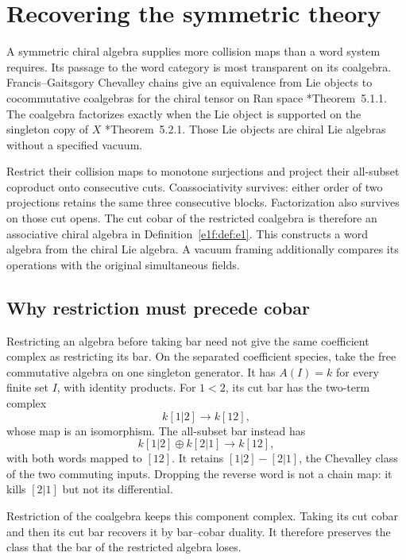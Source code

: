 \section{Recovering the symmetric theory}
\label{e1f:sec:symmetric}

A symmetric chiral algebra supplies more collision maps
than a word system requires. Its passage to the word
category is most transparent on its coalgebra.
Francis--Gaitsgory Chevalley chains give an equivalence
from Lie objects to cocommutative coalgebras for the chiral
tensor on Ran space \cite{chhop:FG}*{Theorem~5.1.1}.
The coalgebra factorizes exactly when the Lie object is
supported on the singleton copy of \(X\)
\cite{chhop:FG}*{Theorem~5.2.1}. Those Lie objects are
chiral Lie algebras without a specified vacuum.

Restrict their collision maps to monotone surjections and
project their all-subset coproduct onto consecutive cuts.
Coassociativity survives: either order of two projections
retains the same three consecutive blocks. Factorization
also survives on those cut opens. The cut cobar of the
restricted coalgebra is therefore an associative chiral
algebra in Definition~\ref{e1f:def:e1}. This constructs a
word algebra from the chiral Lie algebra. A vacuum framing
additionally compares its operations with the original
simultaneous fields.

\subsection{Why restriction must precede cobar}

Restricting\label{e1f:def:free-commutative-singleton-species} an algebra before taking bar need not give the
same coefficient complex as restricting its bar. On the
separated coefficient species, take the free commutative
algebra on one singleton generator. It has \(A(I)=k\)
for every finite set \(I\), with identity products.
For \(1<2\), its cut bar has the two-term complex
\[
 k[1|2]\longrightarrow k[12],
\]
whose map is an isomorphism. The all-subset bar instead has
\[
 k[1|2]\oplus k[2|1]\longrightarrow k[12],
\]
with both words mapped to \([12]\). It retains
\([1|2]-[2|1]\), the Chevalley class of the two commuting
inputs. Dropping the reverse word is not a chain map:
it kills \([2|1]\) but not its differential.

Restriction of the coalgebra keeps this component complex.
Taking its cut cobar and then its cut bar recovers it by
bar--cobar duality. It therefore preserves the class that
the bar of the restricted algebra loses.

